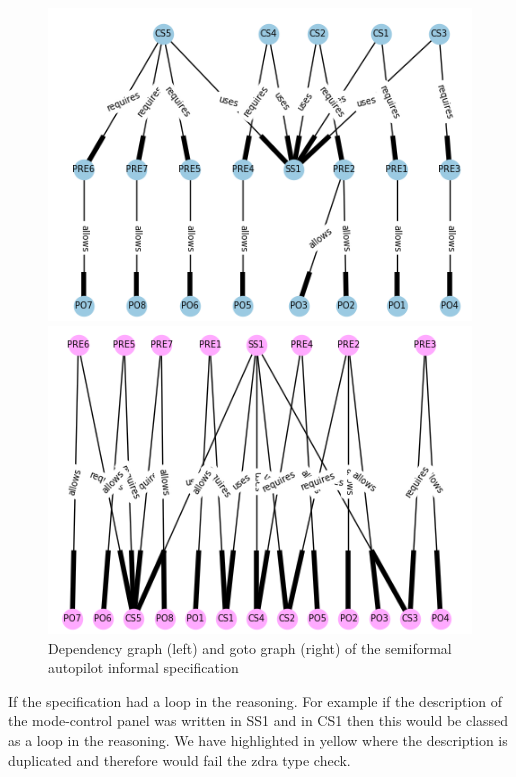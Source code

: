 \begin{figure}[H]
     \centering
     \begin{minipage}{0.45\textwidth}
     \centering
     \includegraphics[scale=0.4]{Figures/fullexample/informaldepgraph.png}
     \end{minipage}\hfill
     \begin{minipage}{0.45\textwidth}
     \centering
     \includegraphics[scale=0.4]{Figures/fullexample/informalgoto.png}
     \end{minipage}
     \caption{Dependency graph (left) and goto graph (right) of the semiformal autopilot informal specification\label{fig:ifdepgoto}}
     \end{figure}

If the specification had a loop in the reasoning. For example if the description
of the mode-control panel was written in SS1 and in CS1 then this would be classed
as a loop in the reasoning. We have highlighted in yellow where the description
is duplicated and therefore would fail the \gls{zdra} type check.

